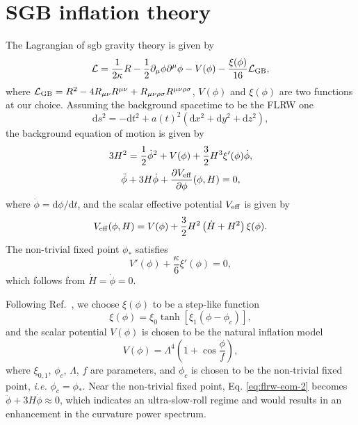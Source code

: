\documentclass[reprint, 10pt, amsmath, amssymb, floatfix, aps, prd, superscriptaddress, nofootinbib, nobibnotes,twocolumn]{revtex4-1}
\def\dd{{\mathrm{d}}}
\begin{document}
\section{SGB inflation theory}
\label{sec:gb-gravity}
The Lagrangian of \ac{sgb} gravity theory is given by
\begin{equation}
    \mathcal L = \frac{1}{2\kappa}R - \frac12\partial_\mu\phi\partial^\mu\phi - V(\phi) - \frac{\xi(\phi)}{16}\mathcal{L}_{\rm GB},
\end{equation}
where $\mathcal{L}_{\rm GB} = R^2 - 4R_{\mu\nu}R^{\mu\nu} + R_{\mu\nu\rho\sigma}R^{\mu\nu\rho\sigma}$, $V(\phi)$ and $\xi(\phi)$ are two functions at our choice. Assuming the background spacetime to be the FLRW one
\begin{equation}
    \dd s^2 = -\dd t^2 + a(t)^2(\dd x^2 + \dd y^2 + \dd z^2),
\end{equation}
the background equation of motion is given by
\begin{gather}
    3H^2 = \frac12 \dot\phi^2 + V(\phi) + \frac32 H^3\xi'(\phi)\dot\phi,\nonumber\\
    \ddot\phi + 3H\dot\phi + \frac{\partial V_{\rm eff}}{\partial\phi}(\phi, H) = 0,\label{eq:flrw-eom-2}
\end{gather}
where $\dot{\phi} = \dd\phi/\dd t$, and the scalar effective potential $V_{\rm eff}$ is given by
\begin{equation}
	V_{\rm eff}(\phi, H) = V(\phi) + \frac32 H^2\left(\dot H + H^2\right)\xi(\phi).
\end{equation}
The non-trivial fixed point $\phi_\ast$ satisfies
\begin{equation}
    V'(\phi) + \frac{\kappa}{6}\xi'(\phi) = 0,
\end{equation}
which follows from $\dot H = \dot\phi = 0$.

Following Ref.~\cite{Kawai:2021edk}, we choose $\xi(\phi)$ to be a step-like function
\begin{equation}
    \xi(\phi) = \xi_0\tanh[\xi_1(\phi - \phi_c)],
\end{equation}
and the scalar potential $V(\phi)$ is chosen to be the natural inflation model
\begin{equation}
    V(\phi) = \Lambda^4\left(1 + \cos\frac{\phi}{f}\right),
\end{equation}
where $\xi_{0,1}$, $\phi_c$, $\Lambda$, $f$ are parameters, and $\phi_c$ is chosen to be the non-trivial fixed point, \textit{i.e.} $\phi_c = \phi_\ast$. Near the non-trivial fixed point, Eq. \eqref{eq:flrw-eom-2} becomes $\ddot\phi + 3H\dot\phi \approx 0$, which indicates an ultra-slow-roll regime and would results in an enhancement in the curvature power spectrum.
\end{document}

